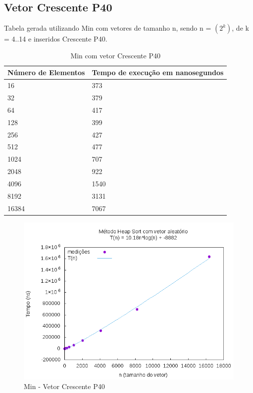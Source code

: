 \documentclass[12pt,a4paper,twoside]{report}
\begin{document}
\subsection{Vetor Crescente P40}
Tabela gerada utilizando Min com vetores de tamanho n, sendo n = $(2^k)$, de k = 4..14 e inseridos Crescente P40.
\begin{table}[H]
\centering
\caption{Min com vetor Crescente P40}
\label{my-label}
\begin{tabular}{|l|l|}
\hline
\multicolumn{1}{|c|}{\textbf{Número de Elementos}} & \multicolumn{1}{c|}{\textbf{Tempo de execução em nanosegundos}} \\ \hline
16 & 373 \\ \hline
32 & 379 \\ \hline
64 & 417 \\ \hline
128 & 399 \\ \hline
256 & 427 \\ \hline
512 & 477 \\ \hline
1024 & 707 \\ \hline
2048 & 922 \\ \hline
4096 & 1540 \\ \hline
8192 & 3131 \\ \hline
16384 & 7067 \\ \hline
\end{tabular}
\end{table}

\begin{figure}[H]
    \centering
    \includegraphics[width=0.7\linewidth]{graficos/HeapSort/vIntAleatorio/vIntAleatorio.png}
  \caption{Min - Vetor Crescente P40}
\end{figure}
\end{document}
